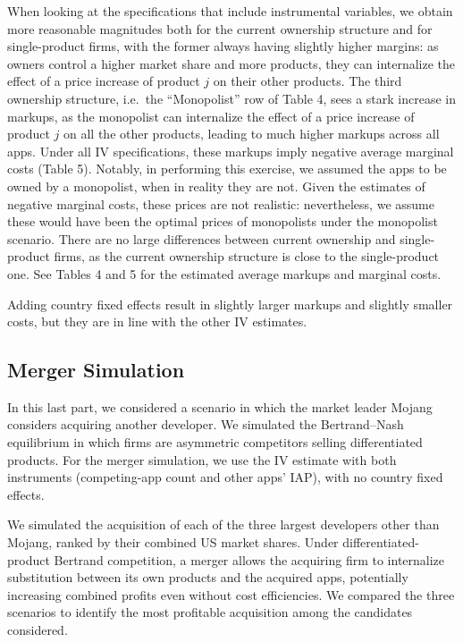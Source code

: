 \documentclass{article}
\begin{document}
When looking at the specifications that include instrumental variables, we obtain more reasonable magnitudes both for the current ownership structure and for single-product firms, with the former always having slightly higher margins: as owners control a higher market share and more products, they can internalize the effect of a price increase of product $j$ on their other products. The third ownership structure, i.e.\ the ``Monopolist'' row of Table 4, sees a stark increase in markups, as the monopolist can internalize the effect of a price increase of product $j$ on all the other products, leading to much higher markups across all apps. Under all IV specifications, these markups imply negative average marginal costs (Table 5). Notably, in performing this exercise, we assumed the apps to be owned by a monopolist, when in reality they are not. Given the estimates of negative marginal costs, these prices are not realistic: nevertheless, we assume these would have been the optimal prices of monopolists under the monopolist scenario. There are no large differences between current ownership and single-product firms, as the current ownership structure is close to the single-product one. See Tables 4 and 5 for the estimated average markups and marginal costs.

Adding country fixed effects result in slightly larger markups and slightly smaller costs, but they are in line with the other IV estimates.

\subsection{Merger Simulation}

In this last part, we considered a scenario in which the market leader Mojang considers acquiring another developer. We simulated the Bertrand--Nash equilibrium in which firms are asymmetric competitors selling differentiated products. For the merger simulation, we use the IV estimate with both instruments (competing-app count and other apps' IAP), with no country fixed effects.

We simulated the acquisition of each of the three largest developers other than Mojang, ranked by their combined US market shares. Under differentiated-product Bertrand competition, a merger allows the acquiring firm to internalize substitution between its own products and the acquired apps, potentially increasing combined profits even without cost efficiencies. We compared the three scenarios to identify the most profitable acquisition among the candidates considered.
\end{document}

